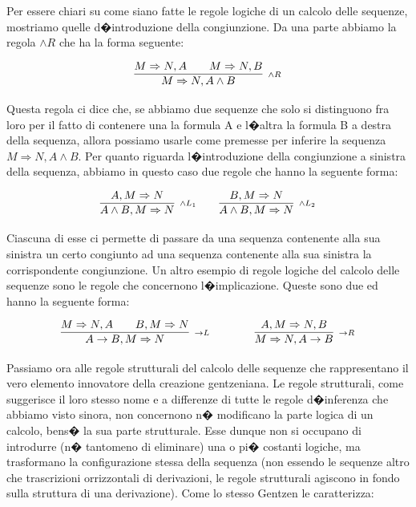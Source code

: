 \documentclass[a4paper,12pt]{aphex}
\begin{document}
Per essere chiari su come siano fatte le regole logiche di un calcolo delle sequenze, mostriamo quelle d�introduzione della congiunzione. Da una parte abbiamo la regola $\wedge R$ che ha la forma seguente: 
                          
\vspace{0.2cm}

                                     
$$\infer[_{\wedge R}]{M\Rightarrow N, A\wedge B}{M\Rightarrow N, A \qquad M\Rightarrow N, B}$$

\vspace{0.2cm}


\noindent Questa regola ci dice che, se abbiamo due sequenze che solo si distinguono fra loro  per il fatto di contenere una la formula A e l�altra la formula B a destra della sequenza, allora possiamo usarle come premesse per inferire la sequenza $M\Rightarrow N, A\wedge B$.  Per quanto riguarda l�introduzione della congiunzione a sinistra della sequenza, abbiamo in questo caso due regole che hanno la seguente forma:
\vspace{0.2cm}

                   
$$\infer[_{\wedge L_{1}}]{A\wedge B, M\Rightarrow N}{A, M\Rightarrow N}\qquad\infer[_{\wedge L_{2}}]{A\wedge B, M\Rightarrow N}{B, M\Rightarrow N}$$

\vspace{0.2cm}


\noindent Ciascuna di esse ci permette di passare da una sequenza contenente alla sua sinistra un certo congiunto ad una sequenza contenente alla sua sinistra la corrispondente congiunzione.
Un altro esempio di regole logiche del calcolo delle sequenze sono le regole che concernono l�implicazione. Queste sono due ed hanno la seguente forma: 

\vspace{0.2cm}

$$\infer[_{\rightarrow L}]{A\rightarrow B, M\Rightarrow N}{M\Rightarrow N, A \qquad B, M\Rightarrow N}\qquad\qquad\infer[_{\rightarrow R}]{M\Rightarrow N, A\rightarrow B}{A, M\Rightarrow N, B}$$

\vspace{0.2cm}

 
Passiamo ora alle regole strutturali del calcolo delle sequenze che rappresentano il vero elemento innovatore della creazione gentzeniana.  Le regole strutturali, come suggerisce il loro stesso nome e a differenze di tutte le regole d�inferenza che abbiamo visto sinora, non concernono n� modificano la parte logica di un calcolo, bens� la sua parte strutturale. Esse dunque non si occupano di introdurre (n� tantomeno di eliminare) una o pi� costanti logiche, ma trasformano la configurazione stessa della sequenza (non essendo le sequenze altro che trascrizioni orrizzontali di derivazioni, le regole strutturali agiscono in fondo sulla struttura di una derivazione). Come lo stesso Gentzen le caratterizza:
\end{document}
